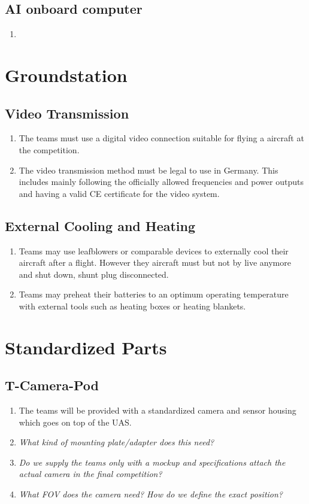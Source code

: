 \documentclass{article}
\begin{document}
\subsection{AI onboard computer}
\begin{enumerate}
  \item
\end{enumerate}


\section{Groundstation}
\subsection{Video Transmission}
\begin{enumerate}
  \item The teams must use a digital video connection suitable for flying a aircraft at the competition.  
  \item The video transmission method must be legal to use in Germany. This includes mainly following the officially allowed frequencies and power outputs and having a valid CE certificate for the video system.
\end{enumerate}

\subsection{External Cooling and Heating}
\begin{enumerate}
  \item Teams may use leafblowers or comparable devices to externally cool their aircraft after a flight. However they aircraft must but not by live anymore and shut down, shunt plug disconnected.  
  \item Teams may preheat their batteries to an optimum operating temperature with external tools such as heating boxes or heating blankets.
\end{enumerate}

\section{Standardized Parts}

\subsection{T-Camera-Pod}
\begin{enumerate}
  \item The teams will be provided with a standardized camera and sensor housing which goes on top of the UAS.
  \item \emph{What kind of mounting plate/adapter does this need?}
  \item \emph{Do we supply the teams only with a mockup and specifications attach the actual camera in the final competition?}
  \item \emph{What FOV does the camera need? How do we define the exact position?}
\end{enumerate}
\end{document}
